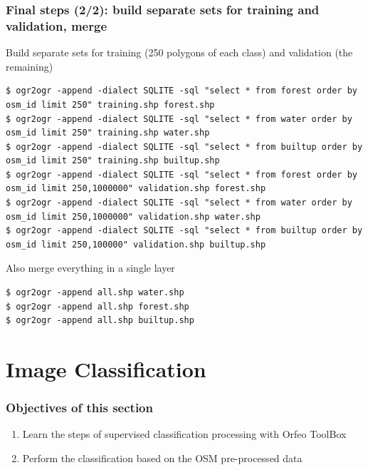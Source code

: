 \documentclass[8pt]{beamer}
\begin{document}
\begin{frame}[fragile]
\frametitle{Final steps (2/2): build separate sets for training and validation, merge}

\begin{block}{Build separate sets for training (250 polygons of each class) and validation (the remaining)}
\begin{scriptsize}
\begin{verbatim}
$ ogr2ogr -append -dialect SQLITE -sql "select * from forest order by osm_id limit 250" training.shp forest.shp
$ ogr2ogr -append -dialect SQLITE -sql "select * from water order by osm_id limit 250" training.shp water.shp
$ ogr2ogr -append -dialect SQLITE -sql "select * from builtup order by osm_id limit 250" training.shp builtup.shp
$ ogr2ogr -append -dialect SQLITE -sql "select * from forest order by osm_id limit 250,1000000" validation.shp forest.shp
$ ogr2ogr -append -dialect SQLITE -sql "select * from water order by osm_id limit 250,1000000" validation.shp water.shp
$ ogr2ogr -append -dialect SQLITE -sql "select * from builtup order by osm_id limit 250,100000" validation.shp builtup.shp
\end{verbatim}
\end{scriptsize}
\end{block}

\begin{block}{Also merge everything in a single layer}
\begin{scriptsize}
\begin{verbatim}
$ ogr2ogr -append all.shp water.shp
$ ogr2ogr -append all.shp forest.shp
$ ogr2ogr -append all.shp builtup.shp
\end{verbatim}
\end{scriptsize}
\end{block}
\end{frame}

\section{Image Classification}

\begin{frame}
\frametitle{Objectives of this section}

\begin{enumerate}
\item Learn the steps of supervised classification processing with Orfeo ToolBox
\item Perform the classification based on the OSM pre-processed data
\end{enumerate}

\end{frame}
\end{document}
